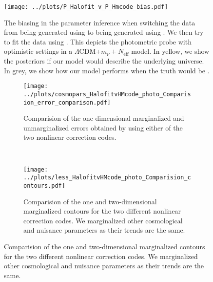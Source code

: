 \documentclass[../main.tex]{subfiles}
\begin{document}
\begin{figure}[h]
    \centering
    \caption{The biasing in the parameter inference when switching the data from being generated using \hmcode to being generated using \hmcode. We then try to fit the data using \hmcode. This depicts the photometric probe with optimistic settings in a $\Lambda$CDM+$m_\nu+N_\mathrm{eff}$ model. In yellow, we show the posteriors if our model \hmcode would describe the underlying universe. In grey, we show how our model performs when the truth would be \halofit.}
    \texttt{[image: ../plots/P\_Halofit\_v\_P\_Hmcode\_bias.pdf]}
    \label{fig:triangle_HCvHM_biased}
\end{figure}
\begin{figure}
    \centering
    \caption{Same as figure \ref{fig:PcbVPmm} but switching the nonlinear model from \hmcode to \halofit.}
    \begin{subfigure}[b]{0.70\textwidth}
        \centering
        \texttt{[image: ../plots/cosmopars\_HalofitvHMcode\_photo\_Comparision\_error\_comparison.pdf]}
        \caption{Comparision of the one-dimensional marginalized and unmarginalized errors obtained by using either of the two nonlinear correction codes.}
        \label{fig:dotsHCvHM}
    \end{subfigure}
    \\
    \begin{subfigure}[b]{0.70\textwidth}
        \centering
        \texttt{[image: ../plots/less\_HalofitvHMcode\_photo\_Comparision\_contours.pdf]}
        \caption{Comparision of the one and two-dimensional marginalized contours for the two different nonlinear correction codes. We marginalized other cosmological and nuisance parameters as their trends are the same.}
        \label{fig:triangleHCvHM}
    \end{subfigure}
       \label{fig:HCvHM} 
\end{figure}
\end{document}
